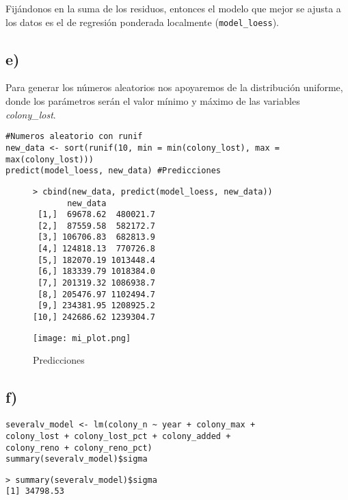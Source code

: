 \documentclass[b4paper]{article}
\begin{document}
    Fij\'andonos en la suma de los residuos, entonces el modelo que mejor se ajusta a los
    datos es el de regresi\'on ponderada localmente (\verb|model_loess|).
    \subsection{e)}
    Para generar los n\'umeros aleatorios nos apoyaremos de la distribuci\'on uniforme, donde
    los par\'ametros ser\'an el valor m\'inimo y m\'aximo de las variables \textit{colony\_lost}.
    \begin{tcolorbox}[title = input]
        \begin{verbatim}
#Numeros aleatorio con runif
new_data <- sort(runif(10, min = min(colony_lost), max = max(colony_lost)))
predict(model_loess, new_data) #Predicciones\end{verbatim}
    \end{tcolorbox}
    \begin{figure}[h]
    \begin{minipage}[c]{0.5\textwidth}
    \begin{tcolorbox}[title = output]
        \begin{verbatim}
> cbind(new_data, predict(model_loess, new_data))
       new_data          
 [1,]  69678.62  480021.7
 [2,]  87559.58  582172.7
 [3,] 106706.83  682813.9
 [4,] 124818.13  770726.8
 [5,] 182070.19 1013448.4
 [6,] 183339.79 1018384.0
 [7,] 201319.32 1086938.7
 [8,] 205476.97 1102494.7
 [9,] 234381.95 1208925.2
[10,] 242686.62 1239304.7\end{verbatim}
    \end{tcolorbox}
    \end{minipage}
    \begin{minipage}[r]{0.4\textwidth}
        \centering
        \texttt{[image: mi\_plot.png]}
        \caption{Predicciones}
    \end{minipage}
    \end{figure}
    \subsection{f)}
    \begin{minipage}[c]{0.5\textwidth}
        \begin{tcolorbox}[title = input]
            \begin{verbatim}
severalv_model <- lm(colony_n ~ year + colony_max +
colony_lost + colony_lost_pct + colony_added +
colony_reno + colony_reno_pct)
summary(severalv_model)$sigma\end{verbatim}
        \end{tcolorbox}
    \end{minipage}
    \begin{minipage}[c][2.94cm][t]{0.4\textwidth}
        \begin{tcolorbox}[title = output]
            \begin{verbatim}
> summary(severalv_model)$sigma
[1] 34798.53\end{verbatim}
        \end{tcolorbox}
    \end{minipage}
\end{document}
